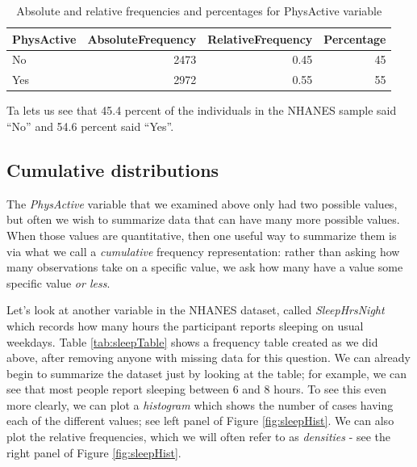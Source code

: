 \documentclass[12pt,]{book}
\theoremstyle{definition}
\theoremstyle{definition}
\theoremstyle{definition}
\theoremstyle{remark}
\begin{document}
\begin{table}

\caption{\label{tab:unnamed-chunk-5}Absolute and relative frequencies and percentages for PhysActive variable}
\centering
\begin{tabular}[t]{l|r|r|r}
\hline
PhysActive & AbsoluteFrequency & RelativeFrequency & Percentage\\
\hline
No & 2473 & 0.45 & 45\\
\hline
Yes & 2972 & 0.55 & 55\\
\hline
\end{tabular}
\end{table}

Ta lets us see that 45.4 percent of the individuals in the NHANES sample said ``No'' and 54.6 percent said ``Yes''.

\hypertarget{cumulative-distributions}{%
\subsection{Cumulative distributions}\label{cumulative-distributions}}

The \emph{PhysActive} variable that we examined above only had two possible values, but often we wish to summarize data that can have many more possible values. When those values are quantitative, then one useful way to summarize them is via what we call a \emph{cumulative} frequency representation: rather than asking how many observations take on a specific value, we ask how many have a value some specific value \emph{or less}.

Let's look at another variable in the NHANES dataset, called \emph{SleepHrsNight} which records how many hours the participant reports sleeping on usual weekdays. Table \ref{tab:sleepTable} shows a frequency table created as we did above, after removing anyone with missing data for this question. We can already begin to summarize the dataset just by looking at the table; for example, we can see that most people report sleeping between 6 and 8 hours. To see this even more clearly, we can plot a \emph{histogram} which shows the number of cases having each of the different values; see left panel of Figure \ref{fig:sleepHist}. We can also plot the relative frequencies, which we will often refer to as \emph{densities} - see the right panel of Figure \ref{fig:sleepHist}.
\end{document}

